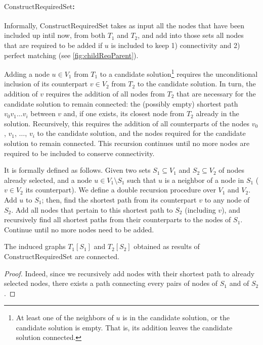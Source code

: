 
			\paragraph{$\text{ConstructRequiredSet}$:}
			Informally, $\text{ConstructRequiredSet}$ takes as input all the nodes that have been included up intil now, from both $T_1$ and $T_2$, and add into those sets all nodes that are required to be added if $u$ is included to keep 1) connectivity and 2) perfect matching (see \cref{fig:childReqParent}).

			Adding a node $u \in V_1$ from $T_1$ to a candidate solution\footnote{At least one of the neighbors of $u$ is in the candidate solution, or the candidate solution is empty. That is, its addition leaves the candidate solution connected.} requires the unconditional inclusion of its counterpart $v \in V_2$ from $T_2$ to the candidate solution.
			In turn, the addition of $v$ requires the addition of all nodes from $T_2$ that are necessary for the candidate solution to remain connected: the (possibly empty) shortest path $v_0 v_1 \ldots v_i$ between $v$ and, if one exists, its closest node from $T_2$ already in the solution.
			Recursively, this requires the addition of all counterparts of the nodes $v_0$, $v_1$, $\ldots$, $v_i$ to the candidate solution, and the nodes required for the candidate solution to remain connected.
			This recursion continues until no more nodes are required to be included to conserve connectivity.

			It is formally defined as follows.
			Given two sets $S_1 \subseteq V_1$ and $S_2 \subseteq V_2$ of nodes already selected, and a node $u \in V_1 \setminus S_1$ such that $u$ is a neighbor of a node in $S_1$ ($v \in V_2$ its counterpart).
			We define a double recursion procedure over $V_1$ and $V_2$.
			Add $u$ to $S_1$; then, find the shortest path from its counterpart $v$ to any node of $S_2$.
			Add all nodes that pertain to this shortest path to $S_2$ (including $v$), and recursively find all shortest paths from their counterparts to the nodes of $S_1$.
			Continue until no more nodes need to be added.

			\begin{proposition}\label{prop:constructFuncConnected}
				The induced graphs $T_1[S_1]$ and $T_2[S_2]$ obtained as results of $\text{ConstructRequiredSet}$ are connected.
			\end{proposition}
			\begin{proof}
				Indeed, since we recursively add nodes with their shortest path to already selected nodes, there exists a path connecting every pairs of nodes of $S_1$ and of $S_2$.
			\end{proof}

